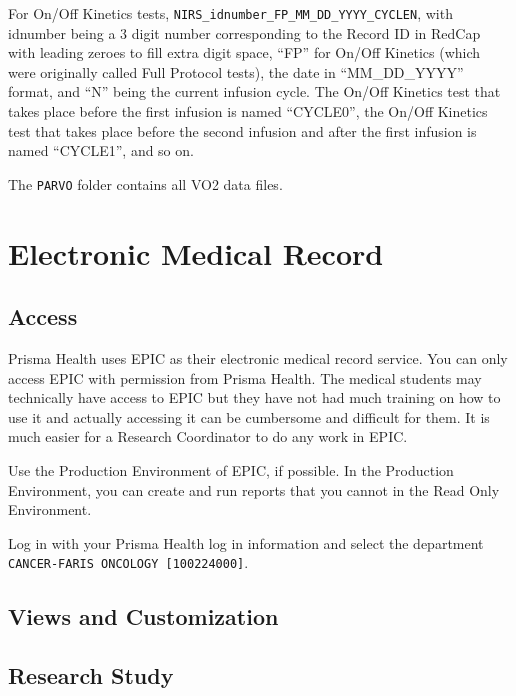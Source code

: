 \documentclass[
]{book}
\begin{document}
For On/Off Kinetics tests, \texttt{NIRS\_idnumber\_FP\_MM\_DD\_YYYY\_CYCLEN}, with idnumber being a 3 digit number corresponding to the Record ID in RedCap with leading zeroes to fill extra digit space, ``FP'' for On/Off Kinetics (which were originally called Full Protocol tests), the date in ``MM\_DD\_YYYY'' format, and ``N'' being the current infusion cycle. The On/Off Kinetics test that takes place before the first infusion is named ``CYCLE0'', the On/Off Kinetics test that takes place before the second infusion and after the first infusion is named ``CYCLE1'', and so on.

The \texttt{PARVO} folder contains all VO2 data files.

\hypertarget{EPIC}{%
\chapter{Electronic Medical Record}\label{EPIC}}

\hypertarget{EPIC-Access}{%
\section{Access}\label{EPIC-Access}}

Prisma Health uses EPIC as their electronic medical record service.
You can only access EPIC with permission from Prisma Health. The medical students may technically have access to EPIC but they have not had much training on how to use it and actually accessing it can be cumbersome and difficult for them. It is much easier for a Research Coordinator to do any work in EPIC.

Use the Production Environment of EPIC, if possible. In the Production Environment, you can create and run reports that you cannot in the Read Only Environment.

Log in with your Prisma Health log in information and select the department \texttt{CANCER-FARIS\ ONCOLOGY\ {[}100224000{]}}.

\hypertarget{EPIC-customization}{%
\section{Views and Customization}\label{EPIC-customization}}

\hypertarget{EPIC-ResearchStudy}{%
\section{Research Study}\label{EPIC-ResearchStudy}}
\end{document}
